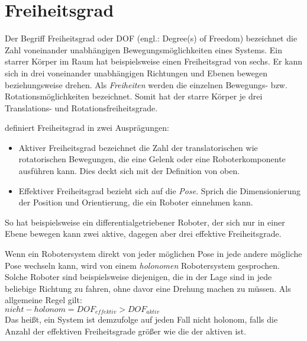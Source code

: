 \section{Freiheitsgrad}
Der Begriff Freiheitsgrad oder DOF (engl.: Degree(s) of Freedom) bezeichnet die Zahl voneinander unabhängigen Bewegungsmöglichkeiten eines Systems. Ein starrer Körper im Raum hat beispielsweise einen Freiheitsgrad von sechs. Er kann sich in drei voneinander unabhängigen Richtungen und Ebenen bewegen beziehungsweise drehen. Als \textit{Freiheiten} werden die einzelnen Bewegungs- bzw. Rotationsmöglichkeiten bezeichnet. Somit hat der starre Körper je drei Translations- und Rotationsfreiheitsgrade. 

\cite{hertzberg2009mobile} definiert Freiheitsgrad in zwei Ausprägungen: 
\begin{itemize}
\item Aktiver Freiheitsgrad bezeichnet die Zahl der translatorischen wie rotatorischen Bewegungen, die eine Gelenk oder eine Roboterkomponente ausführen kann. Dies deckt sich mit der Definition von oben.
\item Effektiver Freiheitsgrad bezieht sich auf die \textit{Pose}. Sprich die Dimensionierung der Position und Orientierung, die ein Roboter einnehmen kann.
\end{itemize}
So hat beispielsweise ein differentialgetriebener Roboter, der sich nur in einer Ebene bewegen kann zwei aktive, dagegen aber drei effektive Freiheitsgrade.

Wenn ein Robotersystem direkt von jeder möglichen Pose in jede andere mögliche Pose wechseln kann, wird von einem \textit{holonomen} Robotersystem gesprochen. Solche Roboter sind beispielsweise diejenigen, die in der Lage sind in jede beliebige Richtung zu fahren, ohne davor eine Drehung machen zu müssen. Als allgemeine Regel gilt: \\
$ nicht-holonom = DOF_{effektiv} > DOF_{aktiv} $ \\
Das heißt, ein System ist demzufolge auf jeden Fall nicht holonom, falls die Anzahl der effektiven Freiheitsgrade größer wie die der aktiven ist.